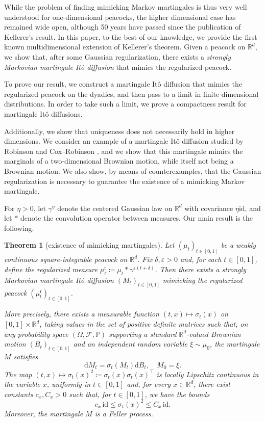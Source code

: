 \documentclass[12pt,oneside]{amsart}
\newtheorem{theorem}{Theorem}[section]
\theoremstyle{definition}
\newcommand{\F}{\mathcal F}
\newcommand{\id}{\mathrm{id}}
\newcommand{\D}{\mathrm{d}}
\newcommand{\R}{\mathbb R}
\newcommand{\reg}{\mathrm{r}}
\def\P{{\mathbb P}}
\def\R{{\mathbb R}}
\numberwithin{equation}{section}
\begin{document}
While the problem of finding mimicking Markov martingales is thus very well understood for one-dimensional peacocks, the higher dimensional case has remained wide open, although 50 years have passed since the publication of Kellerer's result. In this paper, to the best of our knowledge, we provide the first known multidimensional extension of Kellerer's theorem. Given a peacock on $\R^d$, we show that, after some Gaussian regularization, there exists a \emph{strongly Markovian martingale It\^o diffusion} that mimics the regularized peacock.

To prove our result, we construct a martingale It\^o diffusion that mimics the regularized peacock on the dyadics, and then pass to a limit in finite dimensional distributions. In order to take such a limit, we prove a compactness result for martingale It\^o diffusions.

Additionally, we show that uniqueness does not necessarily hold in higher dimensions. We consider an example of a martingale It\^o diffusion studied by Robinson \cite{Ro20} and Cox--Robinson \cite{CoRo22}, and we show that this martingale mimics the marginals of a two-dimensional Brownian motion, while itself not being a Brownian motion. We also show, by means of counterexamples, that the Gaussian regularization is necessary to guarantee the existence of a mimicking Markov martingale.

For $\eta > 0$, let $\gamma^\eta$ denote the centered Gaussian law on $\R^d$ with covariance $\eta \id$, and let $\ast$ denote the convolution operator between measures. Our main result is the following.

\begin{theorem}[existence of mimicking martingales]\label{thm:kellerer-regularized}
	Let $(\mu_t)_{t \in [0, 1]}$ be a weakly continuous square-integrable peacock on $\R^d$. Fix $\delta, \varepsilon > 0$ and, for each $t \in [0, 1]$, define the regularized measure $\mu^\reg_t \coloneqq \mu_t \ast \gamma^{\varepsilon (t +\delta)}$. Then there exists a strongly Markovian martingale It\^o diffusion $(M_t)_{t \in [0, 1]}$ mimicking the regularized peacock $(\mu^\reg_t)_{t \in [0, 1]}$.
	
	More precisely, there exists a measurable function $(t, x) \mapsto \sigma_t(x)$ on $[0, 1] \times \R^d$, taking values in the set of positive definite matrices such that, on any probability space $(\Omega, \F, \P)$ supporting a standard $\R^d$-valued Brownian motion $(B_t)_{t \in [0, 1]}$ and an independent random variable $\xi \sim \mu_0$, the martingale $M$ satisfies
	\begin{equation}\label{eq:mimicking-m}
		\D M_t = \sigma_t(M_t) \D B_t, \quad M_0 = \xi.
	\end{equation}
	The map $(t, x) \mapsto \sigma_t(x)^2 \coloneqq \sigma_t(x)\sigma_t(x)^\top$ is locally Lipschitz continuous in the variable $x$, uniformly in $t \in [0, 1]$ and, for every $x \in \R^d$, there exist constants $c_x, C_x > 0$ such that, for $t \in [0, 1]$, we have the bounds
	\begin{equation}
		c_x \, \id \leq \sigma_t(x)^2 \leq C_x \, \id.
	\end{equation}
	Moreover, the martingale $M$ is a Feller process.
\end{theorem}
\end{document}
